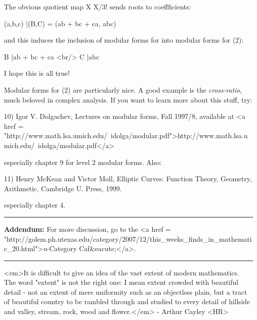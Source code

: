 The obvious quotient map X \to  X/3! sends roots to coeffficients:

(a,b,c) |\to  (B,C) = (ab + bc + ca, abc)

and this induces the inclusion of modular forms for \Gamma  into
modular forms for \Gamma (2):

B |\to  ab + bc + ca  <br/>
C |\to  abc

I hope this is all true!

Modular forms for \Gamma (2) are particularly nice.   A good example
is the \emph{cross-ratio}, much beloved in complex analysis.  If you want
to learn more about this stuff, try:

10) Igor V. Dolgachev, Lectures on modular forms, Fall 1997/8, 
available at <a href = "http://www.math.lsa.umich.edu/~idolga/modular.pdf">http://www.math.lsa.umich.edu/~idolga/modular.pdf</a>

especially chapter 9 for level 2 modular forms.  Also:

11) Henry McKean and Victor Moll, Elliptic Curves: Function Theory,
Geometry, Arithmetic, Cambridge U. Press, 1999.

especially chapter 4.

\par\noindent\rule{\textwidth}{0.4pt}
\textbf{Addendum:} For more discussion, go to the
<a href = "http://golem.ph.utexas.edu/category/2007/12/this_weeks_finds_in_mathematic_20.html">\emph{n}-Category Caf&eacute;</a>.

\par\noindent\rule{\textwidth}{0.4pt}
<em>It is difficult to give an idea of the vast extent of modern mathematics.
The word "extent" is not the right one: I mean extent crowded with 
beautiful detail - not an extent of mere uniformity such as an objectless
plain, but a tract of beautiful country to be rambled through and studied
to every detail of hillside and valley, stream, rock, wood and flower.</em> 
- Arthur Cayley
<HR>



